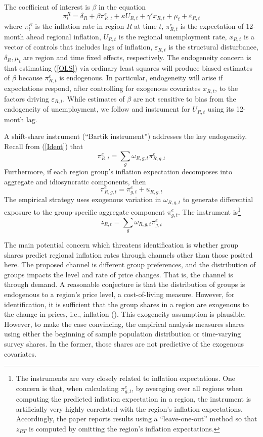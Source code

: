 \documentclass[12pt]{article}
\begin{document}
The coefficient of interest is $\beta$ in the equation
\begin{equation}\label{OLS}
 \pi^R_t = \delta_R + \beta \pi^e_{R,t} + \kappa U_{R,t} + \gamma'x_{R,t} + \mu_t + \varepsilon_{R,t}
\end{equation}
where $\pi^R_t$ is the inflation rate in region $R$ at time $t$, $\pi^e_{R,t}$ is the expectation of 12-month ahead regional inflation, $U_{R,t}$ is the regional unemployment rate, $x_{R,t}$ is a vector of controls that includes lags of inflation, $\varepsilon_{R,t}$ is the structural disturbance, $\delta_R, \mu_t$ are region and time fixed effects, respectively. The endogeneity concern is that estimating (\ref{OLS}) via ordinary least squares will produce biased estimates of $\beta$ because $\pi^e_{R,t}$ is endogenous. In particular, endogeneity will arise if expectations respond, after controlling for exogenous covariates $x_{R,t}$, to the factors driving $\varepsilon_{R,t}$. While estimates of $\beta$ are not sensitive to bias from the endogeneity of unemployment, we follow \cite{NakamuraSteinsson:QJE2022} and instrument for $U_{R,t}$ using its 12-month lag.

A shift-share instrument (``Bartik instrument'') addresses the key endogeneity. Recall from (\ref{Ident}) that 
$$ \pi^e_{R,t} = \sum_{g}\omega_{R,g,t}\pi^e_{R,g,t}$$
Furthermore, if each region group's inflation expectation decomposes into aggregate and idiosyncratic components, then
$$ \pi^e_{R,g,t} = \pi^e_{g,t} + u_{R,g,t}$$
The empirical strategy uses exogenous variation in $\omega_{R,g,t}$ to generate differential exposure to the group-specific aggregate component $\pi^e_{g,t}$. The instrument is\footnote{The instruments are very closely related to inflation expectations. One concern is that, when calculating $\pi^e_{g,t}$, by averaging over all regions when computing the predicted inflation expectation in a region, the instrument is artificially very highly correlated with the region's inflation expectations. Accordingly, the paper reports results using a ``leave-one-out'' method so that $z_{RT}$ is computed by omitting the region's inflation expectations.}
$$ z_{R,t} = \sum_g \omega_{R,g,t} \pi^e_{g,t}$$

The main potential concern which threatens identification is whether group shares predict regional inflation rates through channels other than those posited here. The proposed channel is different group preferences, and the distribution of groups impacts the level and rate of price changes. That is, the channel is through demand. A reasonable conjecture is that the distribution of groups is endogenous to a region's price level, a cost-of-living measure. However, for identification, it is sufficient that the group shares in a region are exogenous to the change in prices, i.e., inflation (\cite{Pinkhametal:AER2020}). This exogeneity assumption is plausible. However, to make the case convincing, the empirical analysis measures shares using either the beginning of sample population distribution or time-varying survey shares. In the former, those shares are not predictive of the exogenous covariates.
\end{document}
